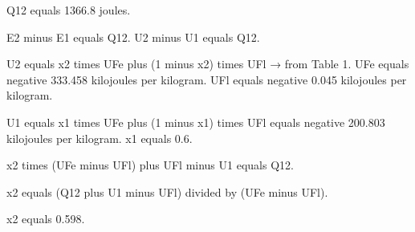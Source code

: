 Q12 equals 1366.8 joules.  

E2 minus E1 equals Q12.  
U2 minus U1 equals Q12.  

U2 equals x2 times UFe plus (1 minus x2) times UFl → from Table 1.  
UFe equals negative 333.458 kilojoules per kilogram.  
UFl equals negative 0.045 kilojoules per kilogram.  

U1 equals x1 times UFe plus (1 minus x1) times UFl equals negative 200.803 kilojoules per kilogram.  
x1 equals 0.6.  

x2 times (UFe minus UFl) plus UFl minus U1 equals Q12.  

x2 equals (Q12 plus U1 minus UFl) divided by (UFe minus UFl).  

x2 equals 0.598.